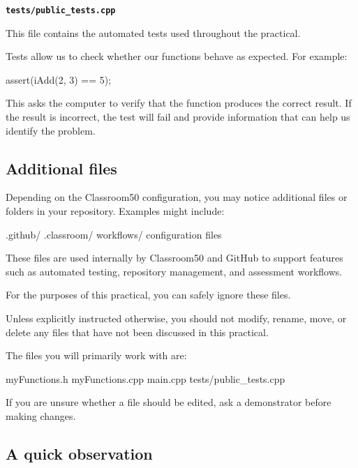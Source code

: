 \documentclass{csc2059practical}
\begin{document}
\begin{infobox}
\textbf{\texttt{tests/public\_tests.cpp}}

This file contains the automated tests used throughout the practical.

Tests allow us to check whether our functions behave as expected. For example:

\begin{cppcode}
assert(iAdd(2, 3) == 5);
\end{cppcode}

This asks the computer to verify that the function produces the correct result. If the result is incorrect, the test will fail and provide information that can help us identify the problem.
\end{infobox}

\subsection{Additional files}

Depending on the Classroom50 configuration, you may notice additional files or folders in your repository. Examples might include:

\begin{terminal}
.github/
.classroom/
workflows/
configuration files
\end{terminal}

These files are used internally by Classroom50 and GitHub to support features such as automated testing, repository management, and assessment workflows.

\begin{importantnote}
For the purposes of this practical, you can safely ignore these files.

Unless explicitly instructed otherwise, you should not modify, rename, move, or delete any files that have not been discussed in this practical.

The files you will primarily work with are:

\begin{terminal}
myFunctions.h
myFunctions.cpp
main.cpp
tests/public_tests.cpp
\end{terminal}

If you are unsure whether a file should be edited, ask a demonstrator before making changes.
\end{importantnote}

\subsection{A quick observation}
\end{document}
